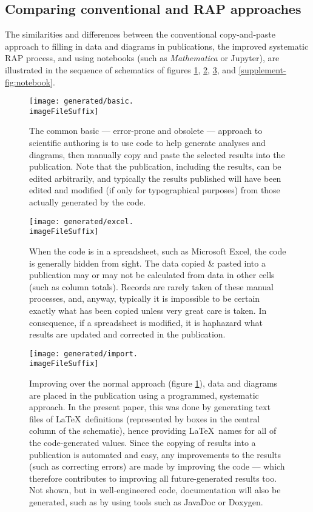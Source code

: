 \documentclass[10pt,a4paper]{article}
\begin{document}


\subsection{Comparing conventional and RAP approaches}
\label{supplement-RAP-diagrams}
The similarities and differences between the conventional copy-and-paste approach to filling in data and diagrams in publications, the improved systematic RAP process, and using notebooks (such as \emph{Mathematica\/} or Jupyter), are illustrated in the sequence of schematics of figures \ref{supplement-fig:basic}, \ref{supplement-fig:excel}, \ref{supplement-fig:rap}, and \ref{supplement-fig:notebook}.

\begin{figure} 
   \centering
   \texttt{[image: generated/basic.\\imageFileSuffix]} 
   \caption{The common basic --- error-prone and obsolete --- approach to scientific authoring is to use code to help generate analyses and diagrams, then manually copy and paste the selected results into the publication. Note that the publication, including the results, can be edited arbitrarily, and typically the results published will have been edited and modified (if only for typographical purposes) from those actually generated by the code.}
   \label{supplement-fig:basic}
\end{figure}
\begin{figure} 
   \centering
   \texttt{[image: generated/excel.\\imageFileSuffix]} 
   \caption{When the code is in a spreadsheet, such as Microsoft Excel, the code is generally hidden from sight. The data copied \& pasted into a publication may or may not be calculated from data in other cells (such as column totals). Records are rarely taken of these manual processes, and, anyway, typically it is impossible to be certain exactly what has been copied unless very great care is taken. In consequence, if a spreadsheet is modified, it is haphazard what results are updated and corrected in the publication. }
   \label{supplement-fig:excel}
\end{figure}
\begin{figure} 
   \centering
   \texttt{[image: generated/import.\\imageFileSuffix]} 
   \caption{Improving over the normal approach (figure \ref{supplement-fig:basic}), data and diagrams are placed in the publication using a programmed, systematic approach. In the present paper, this was done by generating text files of \LaTeX\ definitions (represented by boxes in the central column of the schematic), hence providing \LaTeX\ names for all of the code-generated values. Since the copying of results into a publication is automated and easy, any improvements to the results (such as correcting errors) are made by improving the code --- which therefore contributes to improving all future-generated results too. Not shown, but in well-engineered code, documentation will also be generated, such as by using tools such as JavaDoc or Doxygen.}
   \label{supplement-fig:rap}
\end{figure}
\end{document}
